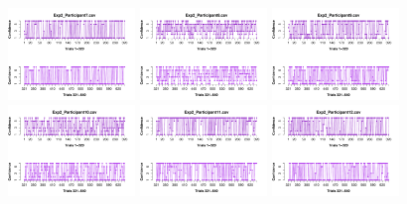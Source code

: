 \begin{itemize}
\begin{figure}[th]
\includegraphics[width=0.30\textwidth]{Figures/Rating_Exp2_P7} \includegraphics[width=0.30\textwidth]{Figures/Rating_Exp2_P8} \includegraphics[width=0.30\textwidth]{Figures/Rating_Exp2_P9}
\includegraphics[width=0.30\textwidth]{Figures/Rating_Exp2_P10} \includegraphics[width=0.30\textwidth]{Figures/Rating_Exp2_P11} \includegraphics[width=0.30\textwidth]{Figures/Rating_Exp2_P12}

\end{figure}
\end{itemize}
